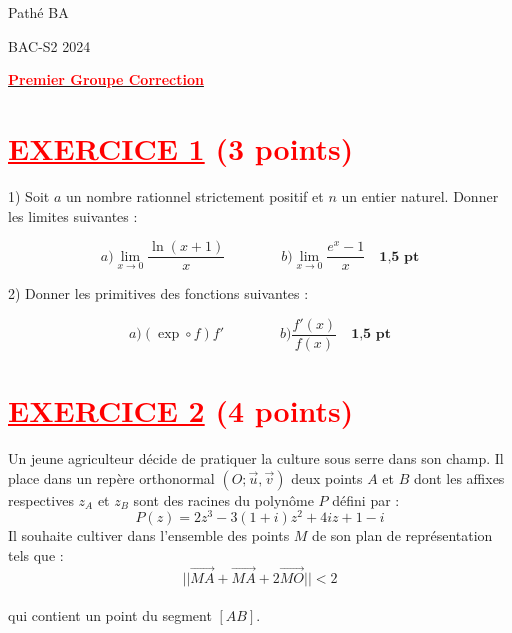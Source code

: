 \documentclass[12pt]{article}
\begin{document}
\begin{minipage}{0.8\textwidth}
	Pathé BA                          
\end{minipage}
\begin{minipage}{0.8\textwidth}
	BAC-S2 2024
\end{minipage}

\begin{center}
\textbf{{\underline{\textcolor{red}{Premier Groupe Correction}}}}
\end{center}





\section*{\textcolor{red}{\underline{EXERCICE 1} (3 points) }}
1) Soit \(a\) un nombre rationnel strictement positif et \(n\) un entier naturel. Donner les limites suivantes :

\[
a) \lim_{x \to 0} \frac{\ln(x+1)}{x}\quad\quad\quad\quad b) \lim_{x \to 0} \frac{e^x - 1}{x}\quad \textbf{1,5 pt} \]


2) Donner les primitives des fonctions suivantes :

\[
a) ( \exp \circ f)f' \quad\quad\quad\quad  b) \frac{f'(x)}{f(x)}  \quad \textbf{1,5 pt}
\]

\section*{\textcolor{red}{\underline{EXERCICE 2} (4 points) }}
Un jeune agriculteur décide de pratiquer la culture sous serre dans son champ. Il place dans un repère orthonormal \( (O; \vec{u}, \vec{v}) \) deux points \( A \) et \( B \) dont les affixes respectives \( z_A \) et \( z_B \) sont des racines du polynôme \( P \) défini par :
\[
P(z) = 2z^3 - 3(1+i)z^2 + 4iz + 1 - i
\]
Il souhaite cultiver dans l'ensemble des points \( M \) de son plan de représentation tels que :
\[
||\overrightarrow{MA} + \overrightarrow{MA} + 2\overrightarrow{MO}|| < 2
\]\\
qui contient un point du segment \( [AB] \).
\end{document}

